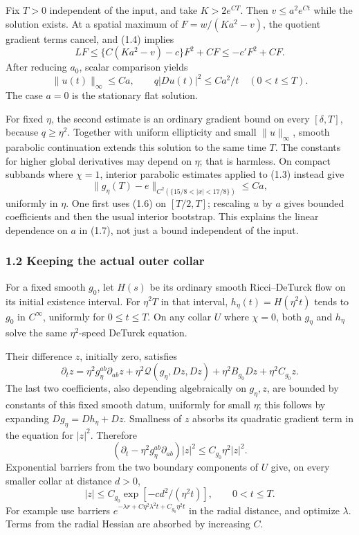 \documentclass[
  11pt,
]{article}
\begin{document}
Fix \(T>0\) independent of the input, and take \(K>2e^{CT}\). Then
\(v\le a^2e^{Ct}\) while the solution exists. At a spatial maximum of
\(F=w/(Ka^2-v)\), the quotient gradient terms cancel, and (1.4) implies
\[
 LF\le\{C(Ka^2-v)-c\}F^2+CF
                   \le-c'F^2+CF.                    \tag{1.5}
\] After reducing \(a_0\), scalar comparison yields \[
 \|u(t)\|_\infty\le Ca,\qquad
 q|Du(t)|^2\le Ca^2/t\quad(0<t\le T).                \tag{1.6}
\] The case \(a=0\) is the stationary flat solution.

For fixed \(\eta\), the second estimate is an ordinary gradient bound on
every \([\delta,T]\), because \(q\ge\eta^2\). Together with uniform
ellipticity and small \(\|u\|_\infty\), smooth parabolic continuation
extends this solution to the same time \(T\). The constants for higher
global derivatives may depend on \(\eta\); that is harmless. On compact
subbands where \(\chi=1\), interior parabolic estimates applied to (1.3)
instead give \[
 \|g_\eta(T)-e\|_{C^2(\{15/8<|x|<17/8\})}\le Ca,     \tag{1.7}
\] uniformly in \(\eta\). One first uses (1.6) on \([T/2,T]\); rescaling
\(u\) by \(a\) gives bounded coefficients and then the usual interior
bootstrap. This explains the linear dependence on \(a\) in (1.7), not
just a bound independent of the input.

\hypertarget{keeping-the-actual-outer-collar}{%
\subsubsection{1.2 Keeping the actual outer
collar}\label{keeping-the-actual-outer-collar}}

For a fixed smooth \(g_0\), let \(H(s)\) be its ordinary smooth
Ricci--DeTurck flow on its initial existence interval. For \(\eta^2T\)
in that interval, \(h_\eta(t)=H(\eta^2t)\) tends to \(g_0\) in
\(C^\infty\), uniformly for \(0\le t\le T\). On any collar \(U\) where
\(\chi=0\), both \(g_\eta\) and \(h_\eta\) solve the same
\(\eta^2\)-speed DeTurck equation.

Their difference \(z\), initially zero, satisfies \[
 \partial_t z=\eta^2g_\eta^{ab}\partial_{ab}z
       +\eta^2\mathcal Q(g_\eta,Dz,Dz)
       +\eta^2B_{g_0}Dz+\eta^2C_{g_0}z.               \tag{1.8}
\] The last two coefficients, also depending algebraically on
\(g_\eta,z\), are bounded by constants of this fixed smooth datum,
uniformly for small \(\eta\); this follows by expanding
\(Dg_\eta=Dh_\eta+Dz\). Smallness of \(z\) absorbs its quadratic
gradient term in the equation for \(|z|^2\). Therefore \[
 (\partial_t-\eta^2g_\eta^{ab}\partial_{ab})|z|^2
                                      \le C_{g_0}\eta^2|z|^2 .
\] Exponential barriers from the two boundary components of \(U\) give,
on every smaller collar at distance \(d>0\), \[
 |z|\le C_{g_0}\exp[-c d^2/(\eta^2t)],\qquad 0<t\le T. \tag{1.9}
\] For example use barriers
\(e^{-\lambda r+C\eta^2\lambda^2t+ C_{g_0}\eta^2t}\) in the radial
distance, and optimize \(\lambda\). Terms from the radial Hessian are
absorbed by increasing \(C\).
\end{document}
